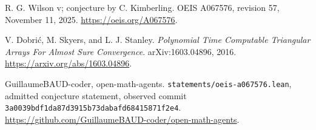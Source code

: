 R. G. Wilson v; conjecture by C. Kimberling.
OEIS A067576, revision 57, November 11, 2025.
\url{https://oeis.org/A067576}.

V. Dobri\'c, M. Skyers, and L. J. Stanley.
\emph{Polynomial Time Computable Triangular Arrays For Almost Sure Convergence}.
arXiv:1603.04896, 2016.
\url{https://arxiv.org/abs/1603.04896}.

GuillaumeBAUD-coder, open-math-agents.
\texttt{statements/oeis-a067576.lean}, admitted conjecture statement,
observed commit \texttt{3a0039bdf1da87d3915b73dabafd68415871f2e4}.
\url{https://github.com/GuillaumeBAUD-coder/open-math-agents}.
